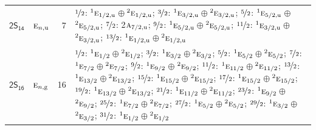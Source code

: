\documentclass[10pt,a4paper]{article}
\numberwithin{equation}{section}
\newcommand{\grp}[1]{\mathsf{#1}}
\newcommand{\irr}[1]{\text{\normalfont\scshape #1}}
\newcommand{\conjpair}[1]{{}^{#1}}
\newcommand{\ptag}[1]{\mathrm{#1}}
\newlength{\fillwidth}\newlength{\cellwidth}\newlength{\colwidth}
\begin{document}
{\begin{longtable}{@{}llr>{\RaggedRight\arraybackslash}p{\fillwidth}@{}}
\href{2S14.pdf}{$\grp{2S_{14}}$} & $\irr{e}_{n,\ptag{u}}$ & 7 & $\nicefrac{1}{2}$: $\conjpair{1}\irr{e}_{1/2,\ptag{u}}$${}\oplus{}$$\conjpair{2}\irr{e}_{1/2,\ptag{u}}$; $\nicefrac{3}{2}$: $\conjpair{1}\irr{e}_{3/2,\ptag{u}}$${}\oplus{}$$\conjpair{2}\irr{e}_{3/2,\ptag{u}}$; $\nicefrac{5}{2}$: $\conjpair{1}\irr{e}_{5/2,\ptag{u}}$${}\oplus{}$$\conjpair{2}\irr{e}_{5/2,\ptag{u}}$; $\nicefrac{7}{2}$: 2$\irr{a}_{7/2,\ptag{u}}$; $\nicefrac{9}{2}$: $\conjpair{1}\irr{e}_{5/2,\ptag{u}}$${}\oplus{}$$\conjpair{2}\irr{e}_{5/2,\ptag{u}}$; $\nicefrac{11}{2}$: $\conjpair{1}\irr{e}_{3/2,\ptag{u}}$${}\oplus{}$$\conjpair{2}\irr{e}_{3/2,\ptag{u}}$; $\nicefrac{13}{2}$: $\conjpair{1}\irr{e}_{1/2,\ptag{u}}$${}\oplus{}$$\conjpair{2}\irr{e}_{1/2,\ptag{u}}$\\
\href{2S16.pdf}{$\grp{2S_{16}}$} & $\irr{e}_{n,\ptag{g}}$ & 16 & $\nicefrac{1}{2}$: $\conjpair{1}\irr{e}_{1/2}$${}\oplus{}$$\conjpair{2}\irr{e}_{1/2}$; $\nicefrac{3}{2}$: $\conjpair{1}\irr{e}_{3/2}$${}\oplus{}$$\conjpair{2}\irr{e}_{3/2}$; $\nicefrac{5}{2}$: $\conjpair{1}\irr{e}_{5/2}$${}\oplus{}$$\conjpair{2}\irr{e}_{5/2}$; $\nicefrac{7}{2}$: $\conjpair{1}\irr{e}_{7/2}$${}\oplus{}$$\conjpair{2}\irr{e}_{7/2}$; $\nicefrac{9}{2}$: $\conjpair{1}\irr{e}_{9/2}$${}\oplus{}$$\conjpair{2}\irr{e}_{9/2}$; $\nicefrac{11}{2}$: $\conjpair{1}\irr{e}_{11/2}$${}\oplus{}$$\conjpair{2}\irr{e}_{11/2}$; $\nicefrac{13}{2}$: $\conjpair{1}\irr{e}_{13/2}$${}\oplus{}$$\conjpair{2}\irr{e}_{13/2}$; $\nicefrac{15}{2}$: $\conjpair{1}\irr{e}_{15/2}$${}\oplus{}$$\conjpair{2}\irr{e}_{15/2}$; $\nicefrac{17}{2}$: $\conjpair{1}\irr{e}_{15/2}$${}\oplus{}$$\conjpair{2}\irr{e}_{15/2}$; $\nicefrac{19}{2}$: $\conjpair{1}\irr{e}_{13/2}$${}\oplus{}$$\conjpair{2}\irr{e}_{13/2}$; $\nicefrac{21}{2}$: $\conjpair{1}\irr{e}_{11/2}$${}\oplus{}$$\conjpair{2}\irr{e}_{11/2}$; $\nicefrac{23}{2}$: $\conjpair{1}\irr{e}_{9/2}$${}\oplus{}$$\conjpair{2}\irr{e}_{9/2}$; $\nicefrac{25}{2}$: $\conjpair{1}\irr{e}_{7/2}$${}\oplus{}$$\conjpair{2}\irr{e}_{7/2}$; $\nicefrac{27}{2}$: $\conjpair{1}\irr{e}_{5/2}$${}\oplus{}$$\conjpair{2}\irr{e}_{5/2}$; $\nicefrac{29}{2}$: $\conjpair{1}\irr{e}_{3/2}$${}\oplus{}$$\conjpair{2}\irr{e}_{3/2}$; $\nicefrac{31}{2}$: $\conjpair{1}\irr{e}_{1/2}$${}\oplus{}$$\conjpair{2}\irr{e}_{1/2}$\\

\end{longtable}}
\end{document}
